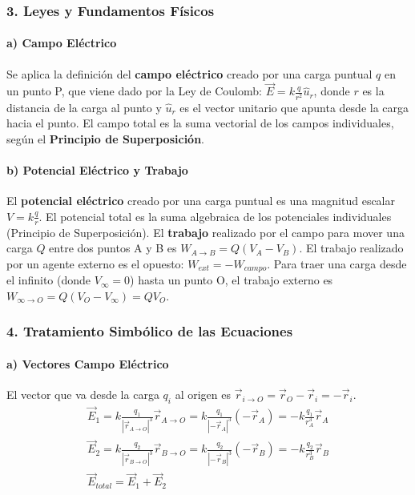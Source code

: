 \subsubsection*{3. Leyes y Fundamentos Físicos}
\paragraph*{a) Campo Eléctrico}
Se aplica la definición del \textbf{campo eléctrico} creado por una carga puntual $q$ en un punto P, que viene dado por la Ley de Coulomb: $\vec{E} = k \frac{q}{r^2} \hat{u}_r$, donde $r$ es la distancia de la carga al punto y $\hat{u}_r$ es el vector unitario que apunta desde la carga hacia el punto. El campo total es la suma vectorial de los campos individuales, según el \textbf{Principio de Superposición}.
\paragraph*{b) Potencial Eléctrico y Trabajo}
El \textbf{potencial eléctrico} creado por una carga puntual es una magnitud escalar $V = k \frac{q}{r}$. El potencial total es la suma algebraica de los potenciales individuales (Principio de Superposición). El \textbf{trabajo} realizado por el campo para mover una carga $Q$ entre dos puntos A y B es $W_{A \to B} = Q (V_A - V_B)$. El trabajo realizado por un agente externo es el opuesto: $W_{ext} = -W_{campo}$. Para traer una carga desde el infinito (donde $V_\infty = 0$) hasta un punto O, el trabajo externo es $W_{\infty \to O} = Q (V_O - V_\infty) = Q V_O$.

\subsubsection*{4. Tratamiento Simbólico de las Ecuaciones}
\paragraph*{a) Vectores Campo Eléctrico}
El vector que va desde la carga $q_i$ al origen es $\vec{r}_{i \to O} = \vec{r}_O - \vec{r}_i = -\vec{r}_i$.
\begin{gather}
    \vec{E}_1 = k \frac{q_1}{|\vec{r}_{A \to O}|^3} \vec{r}_{A \to O} = k \frac{q_1}{|-\vec{r}_A|^3} (-\vec{r}_A) = -k \frac{q_1}{r_A^3} \vec{r}_A \\
    \vec{E}_2 = k \frac{q_2}{|\vec{r}_{B \to O}|^3} \vec{r}_{B \to O} = k \frac{q_2}{|-\vec{r}_B|^3} (-\vec{r}_B) = -k \frac{q_2}{r_B^3} \vec{r}_B \\
    \vec{E}_{total} = \vec{E}_1 + \vec{E}_2
\end{gather}
